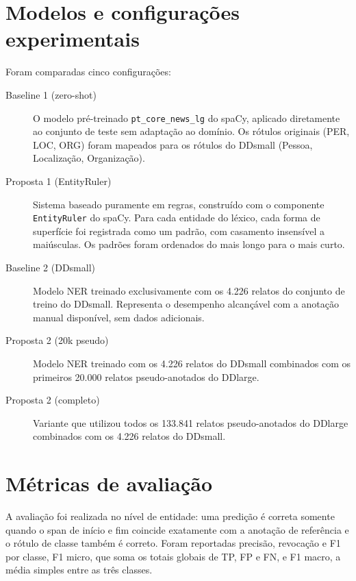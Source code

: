 \documentclass[12pt,a4paper]{article}
\begin{document}
\section{Modelos e configurações experimentais}

Foram comparadas cinco configurações:

\begin{description}
  \item[Baseline 1 (zero-shot)] O modelo pré-treinado \texttt{pt\_core\_news\_lg}
    do spaCy, aplicado diretamente ao conjunto de teste sem adaptação ao domínio.
    Os rótulos originais (PER, LOC, ORG) foram mapeados para os rótulos do
    DDsmall (Pessoa, Localização, Organização).

  \item[Proposta 1 (EntityRuler)] Sistema baseado puramente em regras, construído
    com o componente \texttt{EntityRuler} do spaCy. Para cada entidade do léxico,
    cada forma de superfície foi registrada como um padrão, com casamento
    insensível a maiúsculas. Os padrões foram ordenados do mais longo para o
    mais curto.

  \item[Baseline 2 (DDsmall)] Modelo NER treinado exclusivamente com os 4.226
    relatos do conjunto de treino do DDsmall. Representa o desempenho alcançável
    com a anotação manual disponível, sem dados adicionais.

  \item[Proposta 2 (20k pseudo)] Modelo NER treinado com os 4.226 relatos do
    DDsmall combinados com os primeiros 20.000 relatos pseudo-anotados do DDlarge.

  \item[Proposta 2 (completo)] Variante que utilizou todos os 133.841 relatos
    pseudo-anotados do DDlarge combinados com os 4.226 relatos do DDsmall.
\end{description}

\section{Métricas de avaliação}

A avaliação foi realizada no nível de entidade: uma predição é correta somente
quando o span de início e fim coincide exatamente com a anotação de referência
e o rótulo de classe também é correto. Foram reportadas precisão, revocação e
F1 por classe, F1 micro, que soma os totais globais de TP, FP e FN, e F1
macro, a média simples entre as três classes.
\end{document}
